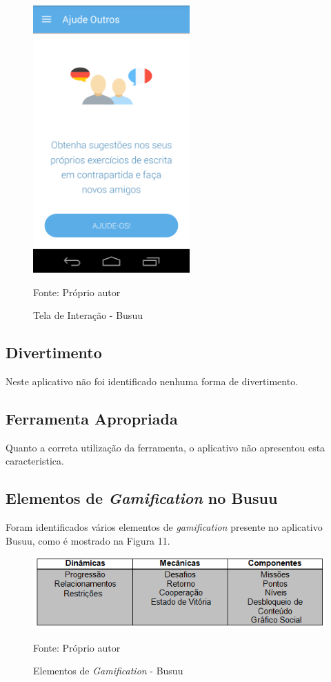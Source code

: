 \documentclass[
	12pt,				%
	openany,			%
	oneside,			%
	a4paper,			%
	english,			%
	french,				%
	spanish,			%
	brazil				%
	]{abntex2}
\begin{document}
\begin{figure}[H]
    \centering
\caption{Tela de Interação - Busuu}
\includegraphics[width=6cm]{figuras/interacaobusuu.png}
\par
 Fonte: Próprio autor
\end{figure}


\subsection{Divertimento}
	Neste aplicativo não foi identificado nenhuma forma de divertimento.


\subsection{Ferramenta Apropriada}
Quanto a correta utilização da ferramenta, o aplicativo não apresentou esta caracteristica.

\subsection{Elementos de \textit{Gamification} no Busuu}
	Foram identificados vários elementos de \textit{gamification} presente no aplicativo Busuu, como é mostrado na Figura 11.




\begin{figure}[H]
    \centering
\caption{Elementos de \textit{Gamification} - Busuu}
\includegraphics[width=12cm]{figuras/elementosbusuu.png}
\par
 Fonte: Próprio autor
\end{figure}
\end{document}
